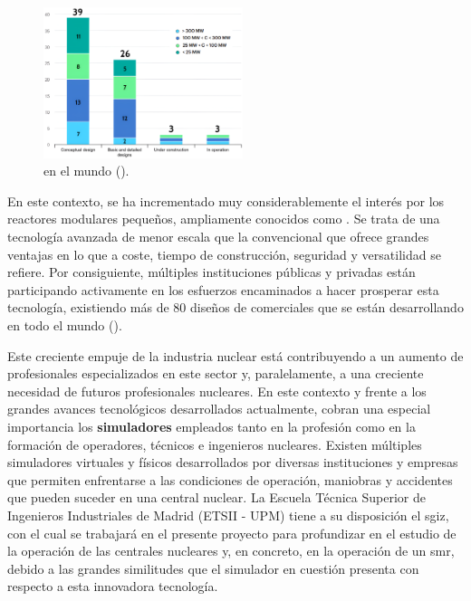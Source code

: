     \begin{figure}
      \vspace{-0.5cm}
      \centering
      \includegraphics[width=0.52\textwidth]{content/figures/global_smr_projects2.png}
      \caption{ en el mundo (\cite{iea_global_smr_projects}).}
      \label{fig:global_smr_projects}
      \vspace{-1cm}
    \end{figure}

    En este contexto, se ha incrementado muy considerablemente el interés por los reactores modulares pequeños, ampliamente conocidos como \textbf{\emph{}}. Se trata de una tecnología avanzada de menor escala que la convencional que ofrece grandes ventajas en lo que a coste, tiempo de construcción, seguridad y versatilidad se refiere. Por consiguiente, múltiples instituciones públicas y privadas están participando activamente en los esfuerzos encaminados a hacer prosperar esta tecnología, existiendo más de 80 diseños de  comerciales que se están desarrollando en todo el mundo (\cite{smr_oiea}).




    
\newpage 

Este creciente empuje de la industria nuclear está contribuyendo a un aumento de profesionales especializados en este sector y, paralelamente, a una creciente necesidad de futuros profesionales nucleares. En este contexto y frente a los grandes avances tecnológicos desarrollados actualmente, cobran una especial importancia los \textbf{simuladores} empleados tanto en la profesión como en la formación de operadores, técnicos e ingenieros nucleares. Existen múltiples simuladores virtuales y físicos desarrollados por diversas instituciones y empresas que permiten enfrentarse a las condiciones de operación, maniobras y accidentes que pueden suceder en una central nuclear. La Escuela Técnica Superior de Ingenieros Industriales de Madrid (ETSII - UPM) tiene a su disposición el \acrfull{sgiz}, con el cual se trabajará en el presente proyecto para profundizar en el estudio de la operación de las centrales nucleares y, en concreto, en la operación de un \acrshort{smr}, debido a las grandes similitudes que el simulador en cuestión presenta con respecto a esta innovadora tecnología.

